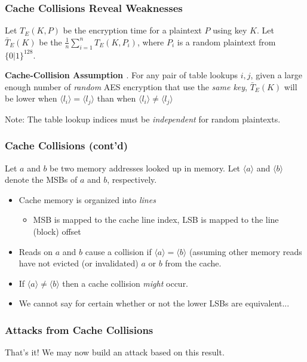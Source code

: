 \documentclass[8pt,handout]{beamer}
\begin{document}
\begin{frame}
	\frametitle{Cache Collisions Reveal Weaknesses}
	Let $T_E(K, P)$ be the encryption time for a plaintext $P$ using key $K$. 
	Let $\bar{T}_E(K)$ be the $\frac{1}{n}\sum_{i = 1}^{n}T_E(K, P_i)$, where $P_i$ is a random plaintext from $\{0|1\}^{128}$.

	\medskip

	\textbf{Cache-Collision Assumption \cite{bonneau}}. For any pair of table lookups $i, j$, given
a large enough number of \emph{random} AES encryption that use the \emph{same key}, $\bar{T}_E(K)$ will
be lower when $\langle l_i \rangle = \langle l_j \rangle$ than when $\langle l_i \rangle \not= \langle l_j \rangle$

	\medskip
	
	Note: The table lookup indices must be \emph{independent} for random plaintexts.
\end{frame}

\begin{frame}
	\frametitle{Cache Collisions (cont'd)}
	Let $a$ and $b$ be two memory addresses looked up in memory. Let $\langle a \rangle$ and $\langle b \rangle$ 
	denote the MSBs of $a$ and $b$, respectively. 
	\begin{itemize}
		\item Cache memory is organized into \emph{lines}
		\begin{itemize}
			\item MSB is mapped to the cache line index, LSB is mapped to the line (block) offset
		\end{itemize}
		\item Reads on $a$ and $b$ cause a collision if $\langle a \rangle = \langle b \rangle$ (assuming other memory reads
		have not evicted (or invalidated) $a$ or $b$ from the cache. 
		\item If $\langle a \rangle \not= \langle b \rangle$ then a cache collision \emph{might} occur.
		\item We cannot say for certain whether or not the lower LSBs are equivalent...
	\end{itemize}
\end{frame}

\begin{frame}
	\frametitle{Attacks from Cache Collisions}
	\begin{center}
	That's it! We may now build an attack based on this result.
	\end{center}
\end{frame}
\end{document}
